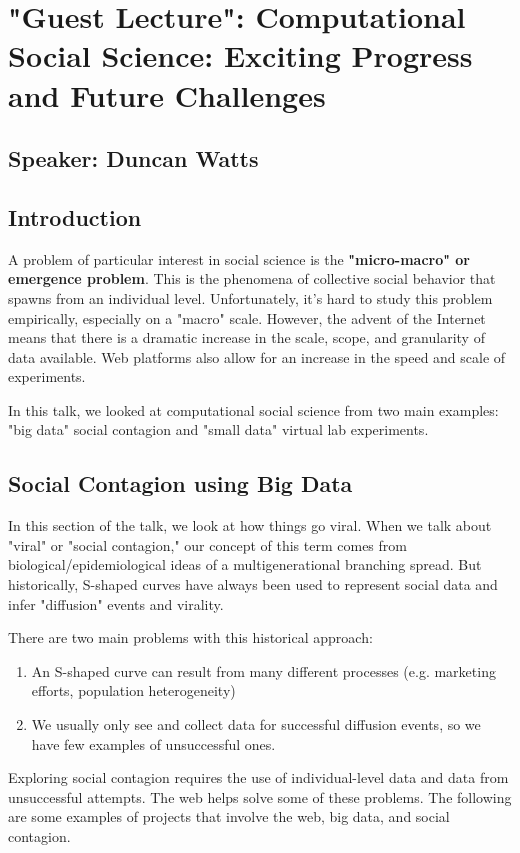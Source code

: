\section{"Guest Lecture": Computational Social Science: Exciting Progress and Future Challenges}
\subsection*{Speaker: Duncan Watts}

\subsection{Introduction}
A problem of particular interest in social science is the \textbf{"micro-macro" or emergence problem}. This is the phenomena of collective social behavior that spawns from an individual level. Unfortunately, it's hard to study this problem empirically, especially on a "macro" scale. However, the advent of the Internet means that there is a dramatic increase in the scale, scope, and granularity of data available. Web platforms also allow for an increase in the speed and scale of experiments.

In this talk, we looked at computational social science from two main examples: "big data" social contagion and "small data" virtual lab experiments. 

\subsection{Social Contagion using Big Data}
In this section of the talk, we look at how things go viral. When we talk about "viral" or "social contagion," our concept of this term comes from biological/epidemiological ideas of a multigenerational branching spread. But historically, S-shaped curves have always been used to represent social data and infer "diffusion" events and virality.

There are two main problems with this historical approach:
\begin{enumerate}
\item An S-shaped curve can result from many different processes (e.g. marketing efforts, population heterogeneity)
\item We usually only see and collect data for successful diffusion events, so we have few examples of unsuccessful ones.
\end{enumerate}

Exploring social contagion requires the use of individual-level data and data from unsuccessful attempts. The web helps solve some of these problems. The following are some examples of projects that involve the web, big data, and social contagion.

